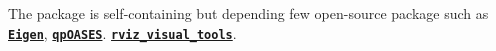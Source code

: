 \label{index_md__home_zheng_robot_ws_zheng_src_ros_wrap_safe_motion_README}%
%
 The package is self-\/containing but depending few open-\/source package such as \href{https://gitlab.com/libeigen/eigen.git}{\texttt{ {\bfseries{Eigen}}}}, \href{https://github.com/kuka-isir/qpOASES}{\texttt{ {\bfseries{qp\+O\+A\+S\+ES}}}}. \href{https://github.com/PickNikRobotics/rviz_visual_tools}{\texttt{ {\bfseries{rviz\+\_\+visual\+\_\+tools}}}}. 